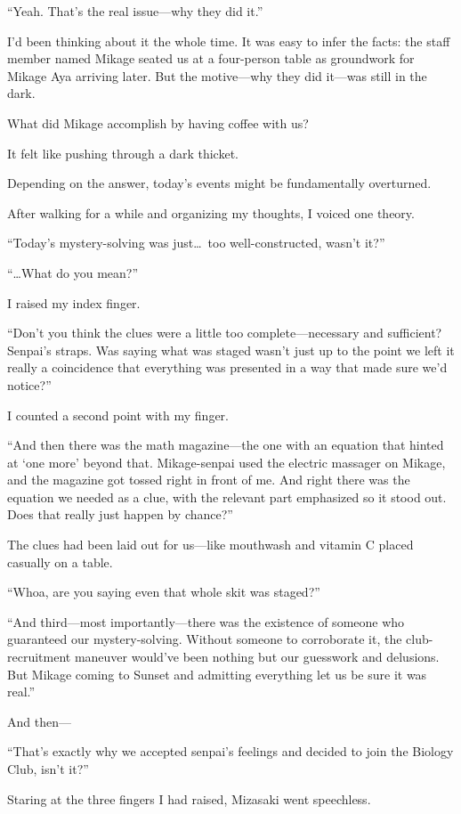 \documentclass[
    a4paper,
    12pt,
    twoside,
    openany,
    UTF8,
    fontset=windows
]{ctexbook}
\begin{document}
``Yeah. That's the real issue---why they did it.''

I'd been thinking about it the whole time. It was easy to infer the facts: the staff member named Mikage seated us at a four-person table as groundwork for Mikage Aya arriving later. But the motive---why they did it---was still in the dark.

What did Mikage accomplish by having coffee with us?

It felt like pushing through a dark thicket.

Depending on the answer, today's events might be fundamentally overturned.

After walking for a while and organizing my thoughts, I voiced one theory.

``Today's mystery-solving was just\dots\ too well-constructed, wasn't it?''

``\dots What do you mean?''

I raised my index finger.

``Don't you think the clues were a little too complete---necessary and sufficient? Senpai's straps. Was saying what was staged wasn't just up to the point we left it really a coincidence that everything was presented in a way that made sure we'd notice?''

I counted a second point with my finger.

``And then there was the math magazine---the one with an equation that hinted at `one more' beyond that. Mikage-senpai used the electric massager on Mikage, and the magazine got tossed right in front of me. And right there was the equation we needed as a clue, with the relevant part emphasized so it stood out. Does that really just happen by chance?''

The clues had been laid out for us---like mouthwash and vitamin C placed casually on a table.

``Whoa, are you saying even that whole skit was staged?''

``And third---most importantly---there was the existence of someone who guaranteed our mystery-solving. Without someone to corroborate it, the club-recruitment maneuver would've been nothing but our guesswork and delusions. But Mikage coming to Sunset and admitting everything let us be sure it was real.''

And then---

``That's exactly why we accepted senpai's feelings and decided to join the Biology Club, isn't it?''

Staring at the three fingers I had raised, Mizasaki went speechless.
\end{document}

